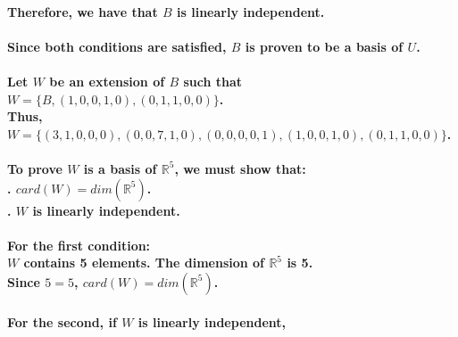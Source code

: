 \documentclass{article}
\begin{document}
\paragraph{\large
Therefore, we have that $B$ is linearly independent.}

\paragraph{\large
Since both conditions are satisfied, $B$ is proven to be a basis of $U$.}

\paragraph{\large
Let $W$ be an extension of $B$ such that $W = \{B, (1, 0, 0, 1, 0), (0, 1, 1, 0, 0)\}$.
\\\indent Thus, $W = \{(3, 1, 0, 0, 0), (0, 0, 7, 1, 0), (0, 0, 0, 0, 1), (1, 0, 0, 1, 0), (0, 1, 1, 0, 0)\}$.}

\paragraph{\large
To prove $W$ is a basis of $\mathbb{R}^5$, we must show that:
\\. $card(W) = dim(\mathbb{R}^5)$.
\\. $W$ is linearly independent.}

\paragraph{\large
For the first condition:
\\\indent $W$ contains 5 elements. The dimension of $\mathbb{R}^5$ is 5. 
\\\indent Since $5=5$, $card(W) = dim(\mathbb{R}^5)$.}

\paragraph{\large
For the second, if $W$ is linearly independent,}
\end{document}
